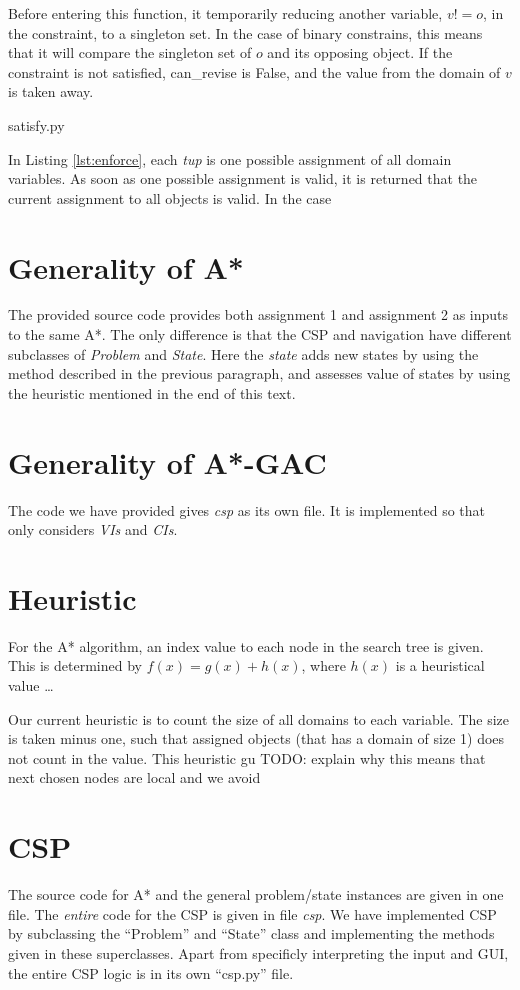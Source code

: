 \documentclass[journal]{IEEEtran}
\begin{document}
Before entering this function, it 
temporarily reducing another variable, $v != o$, in the constraint,
to a singleton set. In the case of binary constrains, this means
that it will compare the singleton set of $o$ and its opposing object.
If the constraint is not satisfied, can\_revise is False, and the value
from the domain of $v$ is taken away.

\begin{lstinputlisting}[caption="Checking constraint",language=Python]{satisfy.py}
    \label{lst:enforce}
\end{lstinputlisting}

In Listing \autoref{lst:enforce}, each \textit{tup} is one possible assignment
of all domain variables. As soon as one possible assignment is valid,
it is returned that the current assignment to all objects is valid.
In the case 

\section{Generality of A*}
The provided source code provides both assignment 1 and assignment 2
as inputs to the same A*. The only difference is that the CSP and navigation
have different subclasses of \textit{Problem} and \textit{State}. Here the \textit{state} adds
new states by using the method described in the previous paragraph, and assesses
value of states by using the heuristic mentioned in the end of this text.

\section{Generality of A*-GAC}
The code we have provided gives \textit{csp} as its own file. 
It is implemented so that only considers \textit{VIs} and \textit{CIs}.
\section{Heuristic}
For the A* algorithm, an index value to each node in the search tree is given.
This is determined by $f(x) = g(x) + h(x)$, where $h(x)$ is a heuristical value \dots

Our current heuristic is to count the size of all domains to each variable.
The size is taken minus one, such that assigned objects (that has a domain
of size 1) does not count in the value. This heuristic gu
TODO: explain why this means that next chosen nodes are local and we avoid

\section{CSP}
The source code for A* and the general problem/state instances are given
in one file. The \textit{entire} code for the CSP is given in file \textit{csp}.
We have implemented CSP by subclassing the ``Problem'' and ``State'' class and
implementing the methods given in these superclasses. Apart from specificly
interpreting the input and GUI, the entire CSP logic is in its own ``csp.py'' file.
\end{document}
